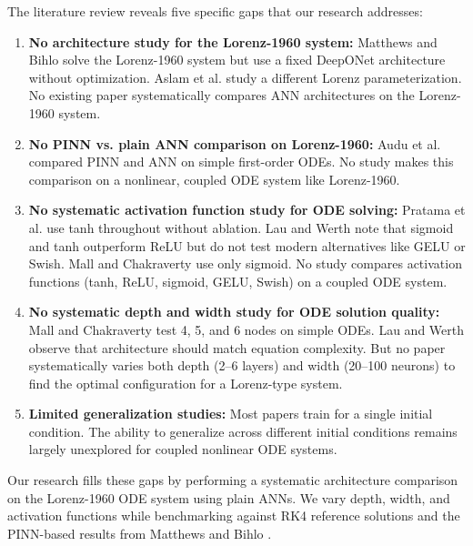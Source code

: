 The literature review reveals five specific gaps that our research addresses:

\begin{enumerate}
    \item \textbf{No architecture study for the Lorenz-1960 system:} Matthews and Bihlo \cite{matthews2024pinnde} solve the Lorenz-1960 system but use a fixed DeepONet architecture without optimization. Aslam et al. \cite{aslam2024neuro} study a different Lorenz parameterization. No existing paper systematically compares ANN architectures on the Lorenz-1960 system.

    \item \textbf{No PINN vs. plain ANN comparison on Lorenz-1960:} Audu et al. \cite{audu2026neural} compared PINN and ANN on simple first-order ODEs. No study makes this comparison on a nonlinear, coupled ODE system like Lorenz-1960.

    \item \textbf{No systematic activation function study for ODE solving:} Pratama et al. \cite{pratama2022ann} use tanh throughout without ablation. Lau and Werth \cite{lau2020oden} note that sigmoid and tanh outperform ReLU but do not test modern alternatives like GELU or Swish. Mall and Chakraverty \cite{mall2013comparison} use only sigmoid. No study compares activation functions (tanh, ReLU, sigmoid, GELU, Swish) on a coupled ODE system.

    \item \textbf{No systematic depth and width study for ODE solution quality:} Mall and Chakraverty \cite{mall2013comparison} test 4, 5, and 6 nodes on simple ODEs. Lau and Werth \cite{lau2020oden} observe that architecture should match equation complexity. But no paper systematically varies both depth (2--6 layers) and width (20--100 neurons) to find the optimal configuration for a Lorenz-type system.

    \item \textbf{Limited generalization studies:} Most papers train for a single initial condition. The ability to generalize across different initial conditions remains largely unexplored for coupled nonlinear ODE systems.
\end{enumerate}

Our research fills these gaps by performing a systematic architecture comparison on the Lorenz-1960 ODE system using plain ANNs. We vary depth, width, and activation functions while benchmarking against RK4 reference solutions and the PINN-based results from Matthews and Bihlo \cite{matthews2024pinnde}.



